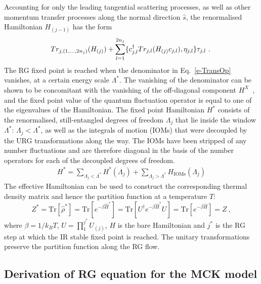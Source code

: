 \documentclass[reprint,onecolumn,prb,superscriptaddress]{revtex4-2}
\begin{document}
{Accounting for only the leading tangential scattering processes, as well as other momentum transfer processes along the normal direction $\hat{s}$, the renormalised Hamiltonian \(H_{(j-1)}\) has the form~\cite{anirbanurg1}
\begin{equation}
\hspace*{-0.1cm}Tr_{j,(1,\ldots,2n_{j})}(H_{(j)})+\sum_{l=1}^{2n_{j}}\lbrace c^{\dagger}_{j,l}Tr_{j,l}(H_{(j)}c_{j,l}),\eta_{j,l}\rbrace\tau_{j,l}~.\label{HRG}
\end{equation}
The RG fixed point is reached when the denominator in Eq.~\ref{e-TransOp} vanishes, at a certain energy scale \(\Lambda^*\). The vanishing of the denominator can be shown to be concomitant with the vanishing of the off-diagonal component \(H^X\)~\cite{anirbanurg1}, and the fixed point value of the quantum fluctuation operator is equal to one of the eigenvalues of the Hamiltonian. The fixed point Hamiltonian \(H^*\) consists of the renormalised, still-entangled degrees of freedom \(\Lambda_j\) that lie inside the window \(\Lambda^*\): \(\Lambda_j < \Lambda^*\), as well as the integrals of motion (IOMs) that were decoupled by the URG transformations along the way. The IOMs have been stripped of any number fluctuations and are therefore diagonal in the basis of the number operators for each of the decoupled degrees of freedom.
\begin{equation}\begin{aligned}
	H^* = \sum_{\Lambda_j < \Lambda^*} H^*(\Lambda_j) + \sum_{\Lambda_j > \Lambda^*}H_\text{IOMs}(\Lambda_j)
\end{aligned}\end{equation}
The effective Hamiltonian can be used to construct the corresponding thermal density matrix and hence the partition function at a temperature \(T\):
\begin{equation}
Z^* = \mathrm{Tr}\left[ \hat{\rho}^*\right] = \mathrm{Tr}\left[ e^{-\beta \hat{H}^{*}}\right] = \mathrm{Tr}\left[ U^{\dagger} e^{-\beta \hat{H}^{*}} U\right] = \mathrm{Tr}\left[ e^{-\beta \hat{H}}\right] = Z
\label{partfunc}~,
\end{equation}
where \(\beta = 1/k_B T\), \(U = \prod_{1}^{j^{*}}U_{(j)}\), $H$ is the bare Hamiltonian and $j^{*}$ is the RG step at which the IR stable fixed point is reached. The unitary transformations preserve the partition function along the RG flow.
}

\subsection{Derivation of RG equation for the MCK model}
\end{document}
